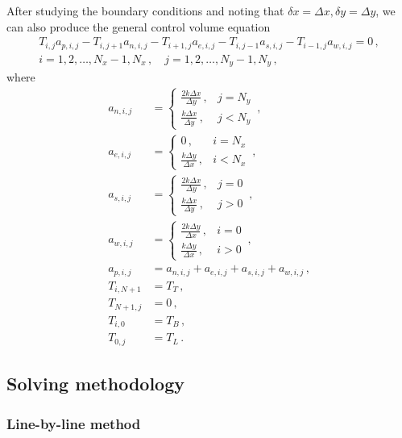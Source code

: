 \documentclass{article}
\begin{document}
After studying the boundary conditions and noting that $\delta x = \Delta x, \delta y = \Delta y$, we can also produce the general control volume equation
\begin{multline}
	\label{eq:CV}
	T_{i,j} a_{p,i,j} - T_{i, j+1} a_{n,i,j} - T_{i+1, j} a_{e,i,j} - T_{i, j-1} a_{s,i,j} - T_{i-1, j} a_{w,i,j} = 0\,,\\ i = 1, 2, \ldots, N_x - 1, N_x\,, \quad j = 1, 2, \ldots, N_y - 1, N_y\,,
\end{multline}
where
\begin{align*}
	a_{n,i,j} & = \begin{cases}
		\frac{2 k \Delta x}{\Delta y}\,, & j = N_y \\
		\frac{k \Delta x}{\Delta y}\,, & j < N_y
	\end{cases}\,, \\
	a_{e,i,j} & = \begin{cases}
		0\,, & i = N_x \\
		\frac{k \Delta  y}{\Delta x}\,, & i < N_x
	\end{cases}\,, \\
	a_{s,i,j} & = \begin{cases}
		\frac{2 k \Delta x}{\Delta y}\,, & j = 0 \\
		\frac{k \Delta x}{\Delta y}\,, & j > 0
	\end{cases}\,, \\
	a_{w,i,j} & = \begin{cases}
		\frac{2 k \Delta y}{\Delta x}\,, & i = 0 \\
		\frac{k \Delta y}{\Delta x}\,, & i > 0
	\end{cases}\,, \\
	a_{p,i,j} & = a_{n,i,j} + a_{e,i,j} + a_{s,i,j} + a_{w,i,j}\,, \\
	T_{i, N+1} & = T_T\,, \\
	T_{N+1, j} & = 0\,, \\
	T_{i, 0} & = T_B\,, \\
	T_{0,j} & = T_L\,.
\end{align*}

\subsection*{Solving methodology}

\subsubsection*{Line-by-line method}
\end{document}
